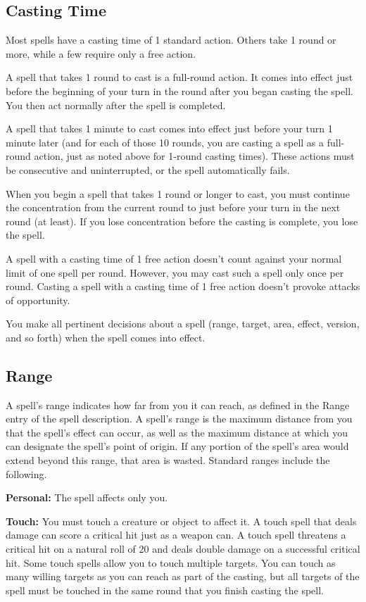 \subsection{Casting Time}
Most spells have a casting time of 1 standard action. Others take 1 round or more, while a few require only a free action.

A spell that takes 1 round to cast is a full-round action. It comes into effect just before the beginning of your turn in the round after you began casting the spell. You then act normally after the spell is completed.

A spell that takes 1 minute to cast comes into effect just before your turn 1 minute later (and for each of those 10 rounds, you are casting a spell as a full-round action, just as noted above for 1-round casting times). These actions must be consecutive and uninterrupted, or the spell automatically fails.

When you begin a spell that takes 1 round or longer to cast, you must continue the concentration from the current round to just before your turn in the next round (at least). If you lose concentration before the casting is complete, you lose the spell.

A spell with a casting time of 1 free action doesn't count against your normal limit of one spell per round. However, you may cast such a spell only once per round. Casting a spell with a casting time of 1 free action doesn't provoke attacks of opportunity.

You make all pertinent decisions about a spell (range, target, area, effect, version, and so forth) when the spell comes into effect.

\subsection{Range}
A spell's range indicates how far from you it can reach, as defined in the Range entry of the spell description. A spell's range is the maximum distance from you that the spell's effect can occur, as well as the maximum distance at which you can designate the spell's point of origin. If any portion of the spell's area would extend beyond this range, that area is wasted. Standard ranges include the following.

\textbf{Personal:} The spell affects only you.

\textbf{Touch:} You must touch a creature or object to affect it. A touch spell that deals damage can score a critical hit just as a weapon can. A touch spell threatens a critical hit on a natural roll of 20 and deals double damage on a successful critical hit. Some touch spells allow you to touch multiple targets. You can touch as many willing targets as you can reach as part of the casting, but all targets of the spell must be touched in the same round that you finish casting the spell.

